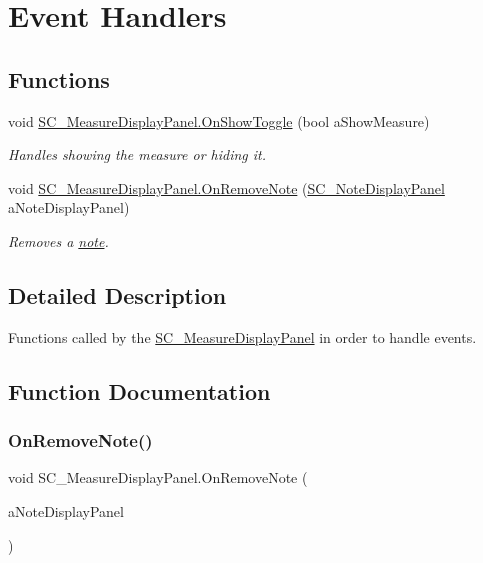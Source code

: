 \hypertarget{group___s_c___m_d_p_handlers}{}\section{Event Handlers}
\label{group___s_c___m_d_p_handlers}
\subsection*{Functions}
\begin{DoxyCompactItemize}
\item 
void \hyperlink{group___s_c___m_d_p_handlers_ga31c72fee5ddd5ae7b057b2f265341263}{S\+C\+\_\+\+Measure\+Display\+Panel.\+On\+Show\+Toggle} (bool a\+Show\+Measure)
\begin{DoxyCompactList}\small\item\em Handles showing the measure or hiding it. \end{DoxyCompactList}\item 
void \hyperlink{group___s_c___m_d_p_handlers_gab48fa7fe4d7d4b29a3b0567be2b29849}{S\+C\+\_\+\+Measure\+Display\+Panel.\+On\+Remove\+Note} (\hyperlink{class_s_c___note_display_panel}{S\+C\+\_\+\+Note\+Display\+Panel} a\+Note\+Display\+Panel)
\begin{DoxyCompactList}\small\item\em Removes a \hyperlink{group___music_structs_struct_music_1_1_combined_note}{note}. \end{DoxyCompactList}\end{DoxyCompactItemize}


\subsection{Detailed Description}
Functions called by the \hyperlink{class_s_c___measure_display_panel}{S\+C\+\_\+\+Measure\+Display\+Panel} in order to handle events. 

\subsection{Function Documentation}
\mbox{\label{group___s_c___m_d_p_handlers_gab48fa7fe4d7d4b29a3b0567be2b29849}} 
\subsubsection{\texorpdfstring{On\+Remove\+Note()}{OnRemoveNote()}}
{\footnotesize\ttfamily void S\+C\+\_\+\+Measure\+Display\+Panel.\+On\+Remove\+Note (\begin{DoxyParamCaption}\item[{\hyperlink{class_s_c___note_display_panel}{S\+C\+\_\+\+Note\+Display\+Panel}}]{a\+Note\+Display\+Panel }\end{DoxyParamCaption})}



